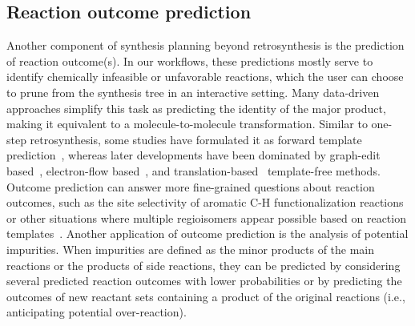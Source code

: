 \documentclass[pdflatex,sn-mathphys-num]{sn-jnl}%
\theoremstyle{thmstyleone}%
\theoremstyle{thmstyletwo}%
\theoremstyle{thmstylethree}%
\begin{document}
\subsection{Reaction outcome prediction}\label{results_forward}


Another component of synthesis planning beyond retrosynthesis is the prediction of reaction outcome(s). In our workflows, these predictions mostly serve to identify chemically infeasible or unfavorable reactions, which the user can choose to prune from the synthesis tree in an interactive setting. Many data-driven approaches simplify this task as predicting the identity of the major product, making it equivalent to a molecule-to-molecule transformation. Similar to one-step retrosynthesis, some studies have formulated it as forward template prediction~\citep{coley_prediction_2017,chen_generalized-template-based_2022}, whereas later developments have been dominated by graph-edit based~\citep{coley_graph-convolutional_2019,sacha_molecule_2021}, electron-flow based~\citep{bradshaw_generative_2019,bi_non-autoregressive_2021}, and translation-based~\citep{schwaller_molecular_2019,tetko_state---art_2020,tu_permutation_2022,zhong_root-aligned_2022} template-free methods. Outcome prediction can answer more fine-grained questions about reaction outcomes, such as the site selectivity of aromatic C-H functionalization reactions~\citep{struble_multitask_2020} or other situations where multiple regioisomers appear possible based on reaction templates~\citep{guan_regio-selectivity_2021}. Another application of outcome prediction is the analysis of potential impurities. When impurities are defined as the minor products of the main reactions or the products of side reactions, they can be predicted by considering several predicted reaction outcomes with lower probabilities or by predicting the outcomes of new reactant sets containing a product of the original reactions (i.e., anticipating potential over-reaction).

\end{document}
